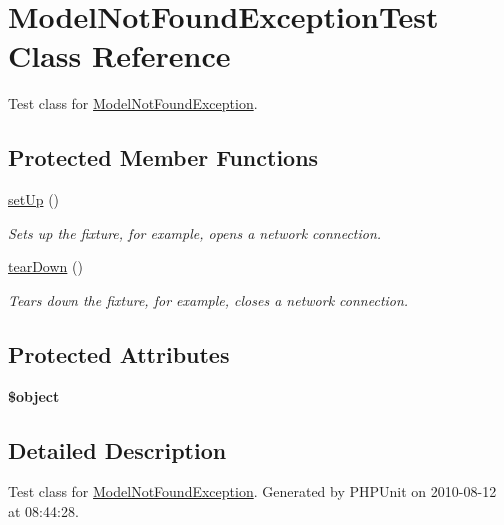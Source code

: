 \hypertarget{class_model_not_found_exception_test}{
\section{ModelNotFoundExceptionTest Class Reference}
\label{class_model_not_found_exception_test}
}


Test class for \hyperlink{class_model_not_found_exception}{ModelNotFoundException}.  


\subsection*{Protected Member Functions}
\begin{DoxyCompactItemize}
\item 
\hyperlink{class_model_not_found_exception_test_a54e7738907530df1aae246c844b462de}{setUp} ()
\begin{DoxyCompactList}\small\item\em Sets up the fixture, for example, opens a network connection. \item\end{DoxyCompactList}\item 
\hyperlink{class_model_not_found_exception_test_a533e2aabca3df741276c141edbe86fd2}{tearDown} ()
\begin{DoxyCompactList}\small\item\em Tears down the fixture, for example, closes a network connection. \item\end{DoxyCompactList}\end{DoxyCompactItemize}
\subsection*{Protected Attributes}
\begin{DoxyCompactItemize}
\item 
\hypertarget{class_model_not_found_exception_test_aeb02d9c13d528668abda7ad90460958e}{
{\bfseries \$object}}
\label{class_model_not_found_exception_test_aeb02d9c13d528668abda7ad90460958e}

\end{DoxyCompactItemize}


\subsection{Detailed Description}
Test class for \hyperlink{class_model_not_found_exception}{ModelNotFoundException}. Generated by PHPUnit on 2010-\/08-\/12 at 08:44:28. 

